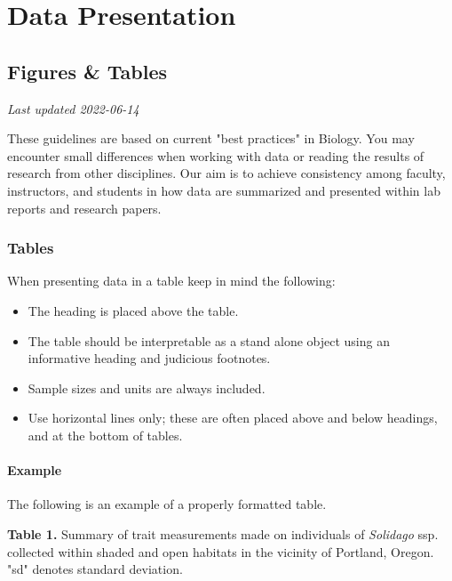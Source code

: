 \documentclass[
]{book}
\providecommand{\tightlist}{%
  \setlength{\itemsep}{0pt}\setlength{\parskip}{0pt}}
\begin{document}
\hypertarget{part-data-presentation}{%
\part*{Data Presentation}\label{part-data-presentation}}

\hypertarget{figures-tables}{%
\chapter{Figures \& Tables}\label{figures-tables}}

\emph{Last updated 2022-06-14}

These guidelines are based on current "best practices" in Biology. You may encounter small differences when working with data or reading the results of research from other disciplines. Our aim is to achieve consistency among faculty, instructors, and students in how data are summarized and presented within lab reports and research papers.

\hypertarget{tables}{%
\section{Tables}\label{tables}}

When presenting data in a table keep in mind the following:

\begin{itemize}
\tightlist
\item
  The heading is placed above the table.
\item
  The table should be interpretable as a stand alone object using an informative heading and judicious footnotes.
\item
  Sample sizes and units are always included.
\item
  Use horizontal lines only; these are often placed above and below headings, and at the bottom of tables.
\end{itemize}

\hypertarget{example}{%
\subsection*{Example}\label{example}}

The following is an example of a properly formatted table.

\textbf{Table 1.} Summary of trait measurements made on individuals of \emph{Solidago} ssp. collected within shaded and open habitats in the vicinity of Portland, Oregon. "sd" denotes standard deviation.
\end{document}
